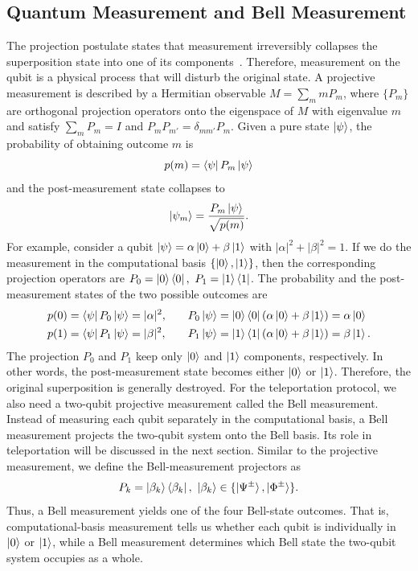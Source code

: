 \documentclass[aps,prd,preprint,floats,epsf,superscriptaddress,nofootinbib]{revtex4}
\begin{document}
\subsection{Quantum Measurement and Bell Measurement} The projection postulate states that measurement irreversibly collapses the superposition state into one of its components~\cite{NielsenChuang2000}. Therefore, measurement on the qubit is a physical process that will disturb the original state. A projective measurement is described by a Hermitian observable $M=\sum_m mP_m$, where $\{P_m\}$ are orthogonal projection operators onto the eigenspace of $M$ with eigenvalue $m$ and satisfy $\sum_m P_m=I$ and $P_mP_{m'}=\delta_{mm'}P_m$. Given a pure state $\ket{\psi}$, the probability of obtaining outcome $m$ is \begin{equation}
  p(m)=\bra{\psi}P_m\ket{\psi}
\end{equation}
and the post-measurement state collapses to~\cite{NielsenChuang2000} \begin{equation}
  \ket{\psi_m}=\frac{P_m\ket{\psi}}{\sqrt{p(m)}}.
  \label{Eq:post-measurement normalization}
\end{equation} For example, consider a qubit $\ket{\psi}=\alpha\ket{0}+\beta\ket{1}$ with $|\alpha|^2+|\beta|^2=1$. If we do the measurement in the computational basis $\{\ket{0},\ket{1}\}$, then the corresponding projection operators are $P_0=\ket{0}\bra{0}, \ P_1=\ket{1}\bra{1}$. The probability and the post-measurement states of the two possible outcomes are \begin{equation}
  \begin{aligned}
    p(0)&=\bra{\psi}P_0\ket{\psi}=|\alpha|^2, 
&\quad P_0\ket{\psi}&=\ket{0}\bra{0}(\alpha\ket{0}+\beta\ket{1})=\alpha\ket{0}\\
p(1)&=\bra{\psi}P_1\ket{\psi}=|\beta|^2,
&\quad  P_1\ket{\psi}&=\ket{1}\bra{1}(\alpha\ket{0}+\beta\ket{1})=\beta\ket{1}.\\
  \end{aligned}
\end{equation} 
The projection $P_0$ and $P_1$ keep only $\ket{0}$ and $\ket{1}$ components, respectively. In other words, the post-measurement state becomes either $\ket{0}$ or $\ket{1}$. Therefore, the original superposition is generally destroyed. For the teleportation protocol, we also need a two-qubit projective measurement called the Bell measurement. Instead of measuring each qubit separately in the computational basis, a Bell measurement projects the two-qubit system onto the Bell basis. Its role in teleportation will be discussed in the next section. Similar to the projective measurement, we define the Bell-measurement projectors as \begin{equation}
  P_k=\ket{\beta_k}\bra{\beta_k}, \ \ket{\beta_k}\in\{\ket{\Psi^{\pm}},\ket{\Phi^{\pm}}\}.
\end{equation} Thus, a Bell measurement yields one of the four Bell-state outcomes. That is, computational-basis measurement tells us whether each qubit is individually in $\ket{0}$ or $\ket{1}$, while a Bell measurement determines which Bell state the two-qubit system occupies as a whole. 
\end{document}
